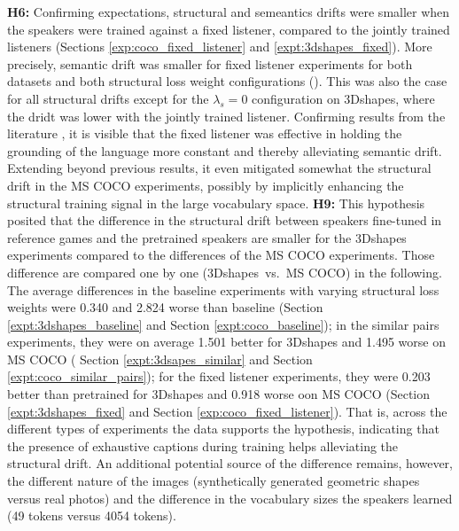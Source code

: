 \textbf{H6:} Confirming expectations, structural and semeantics drifts were smaller when the speakers were trained against a fixed listener, compared to the jointly trained listeners (Sections \ref{exp:coco_fixed_listener} and \ref{expt:3dshapes_fixed}). More precisely, semantic drift was smaller for fixed listener experiments for both datasets and both structural loss weight configurations (). This was also the case for all structural drifts except for the $\lambda_s = 0$ configuration on 3Dshapes, where the dridt was lower with the jointly trained listener. Confirming results from the literature \parencite{lazaridou2020multi}, it is visible that the fixed listener was effective in holding the grounding of the language more constant and thereby alleviating semantic drift. Extending beyond previous results, it even mitigated somewhat the structural drift in the MS COCO experiments, possibly by implicitly enhancing the structural training signal in the large vocabulary space.\newline
\textbf{H9:} %
This hypothesis posited that the difference in the structural drift between speakers fine-tuned in reference games and the pretrained speakers are smaller for the 3Dshapes experiments compared to the differences of the MS COCO experiments.
Those difference are compared one by one (3Dshapes~vs.~MS COCO) in the following. The average differences in the baseline experiments with varying structural loss weights were 0.340 and 2.824 worse than baseline (Section \ref{expt:3dshapes_baseline} and Section \ref{expt:coco_baseline}); in the similar pairs experiments, they were on average 1.501 better for 3Dshapes and 1.495 worse on MS COCO ( Section \ref{expt:3dsapes_similar} and Section \ref{expt:coco_similar_pairs}); for the fixed listener experiments, they were 0.203 better than pretrained for 3Dshapes and 0.918 worse oon MS COCO (Section \ref{expt:3dshapes_fixed} and Section \ref{exp:coco_fixed_listener}).  That is, across the different types of experiments the data supports the hypothesis, indicating that the presence of exhaustive captions during training helps alleviating the structural drift. An additional potential source of the difference remains, however, the different nature of the images (synthetically generated geometric shapes versus real photos) and the difference in the vocabulary sizes the speakers learned (49 tokens versus 4054 tokens).   \newline
